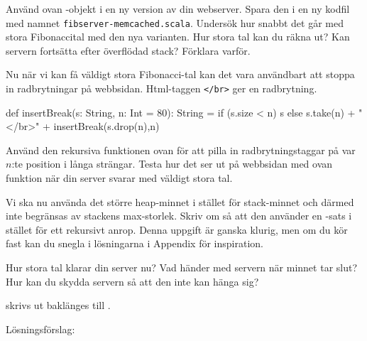 \Subtask Använd ovan -objekt i en ny version av din webserver. Spara den i en ny kodfil med namnet \texttt{fibserver-memcached.scala}. Undersök hur snabbt det går med stora Fibonaccital med den nya varianten. Hur stora tal kan du räkna ut? Kan servern fortsätta efter överflödad stack? Förklara varför.

\Subtask Nu när vi kan få väldigt stora Fibonacci-tal kan det vara användbart att stoppa in radbrytningar på webbsidan. Html-taggen \texttt{</br>} ger en radbrytning.
\begin{Code}
  def insertBreak(s: String, n: Int = 80): String = {
    if (s.size < n) s
    else s.take(n) + "</br>" + insertBreak(s.drop(n),n)
  }
\end{Code}
Använd den rekursiva funktionen ovan för att pilla in radbrytningstaggar på var $n$:te position i långa strängar. Testa hur det ser ut på webbsidan med ovan funktion när din server svarar med väldigt stora tal.

\Subtask Vi ska nu använda det större heap-minnet i stället för stack-minnet och därmed inte begränsas av stackens max-storlek. Skriv om  så att den använder en -sats i stället för ett rekursivt anrop. Denna uppgift är ganska klurig, men om du kör fast kan du snegla i lösningarna i Appendix för inspiration.

Hur stora tal klarar din server nu? Vad händer med servern när minnet tar slut? Hur kan du skydda servern så att den inte kan hänga sig?

\SOLUTION


\TaskSolved \what

\SubtaskSolved  {} skrivs ut baklänges till .

\SubtaskSolved

\SubtaskSolved

\SubtaskSolved

\SubtaskSolved

\SubtaskSolved

\SubtaskSolved

\SubtaskSolved

\SubtaskSolved

Lösningsförslag:


\QUESTEND






